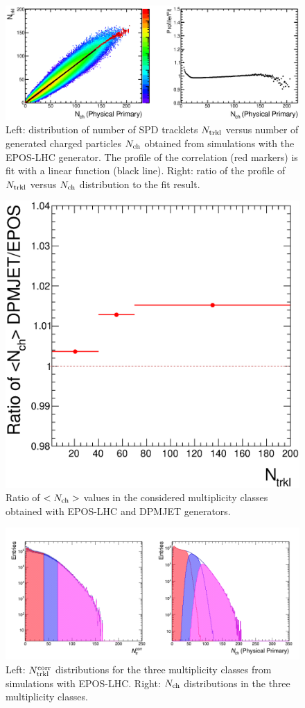 \begin{figure}[h]
\centering
 \includegraphics[width=1.\textwidth]{FigCap6/NtrklVsNchPhysPrimWithNtrklsReweight17f2a.eps}
 \caption{Left: distribution of number of SPD tracklets $N_{\rm trkl}$ versus number of generated charged particles $N_{\rm ch}$ obtained from simulations with the EPOS-LHC generator. The profile of the correlation (red markers) is fit with a linear function (black line). Right: ratio of the profile of $N_{\rm trkl}$ versus $N_{\rm ch}$ distribution to the fit result.}
 \label{fig:NtrklVsNch}
\end{figure}

\begin{figure}[!h]
\centering
 \includegraphics[width=.49\textwidth]{FigCap6/comparisonNtrkl_17f2b_17d2a_17f2a_onlySyst.eps}
 \caption{Ratio of $<N_{\rm ch}>$ values in the considered multiplicity classes obtained with EPOS-LHC and DPMJET generators.}
 \label{fig:NchVsMCgenerator}
 \end{figure}

\begin{figure}[!h]
\centering
 \includegraphics[width=1.\textwidth]{FigCap6/NtrklNchDistrWithNtrklsReweight_17f2a.png}
 \caption{Left: $N_{\rm trkl}^{\rm corr}$ distributions for the three multiplicity classes from simulations with EPOS-LHC. Right: $N_{\rm ch}$ distributions 
 in the three multiplicity classes.}
 \label{fig:NtrklProj}
\end{figure}


